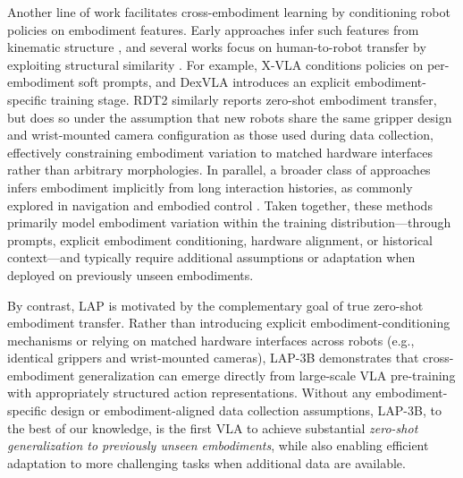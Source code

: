 Another line of work facilitates cross-embodiment learning by conditioning robot policies on embodiment features. Early approaches infer such features from kinematic structure \cite{huang2020policycontrolallshared, kurin2021bodycagerolemorphology, gupta2022metamorphlearninguniversalcontrollers, patel2024getzerographembodimenttransformer, bohlinger2025policyrunallendtoend}, and several works focus on human-to-robot transfer by exploiting structural similarity \cite{chen2024roviaugrobotviewpointaugmentation, lum2025crossinghumanrobotembodimentgap, lepert2025phantomtrainingrobotsrobots, ren2025motiontracksunifiedrepresentation}. For example, X-VLA \cite{zheng2025xvlasoftpromptedtransformerscalable} conditions policies on per-embodiment soft prompts, and DexVLA \cite{wen2025dexvlavisionlanguagemodelplugin} introduces an explicit embodiment-specific training stage. RDT2 \cite{liu2026rdt2exploringscalinglimit} similarly reports zero-shot embodiment transfer, but does so under the assumption that new robots share the same gripper design and wrist-mounted camera configuration as those used during data collection, effectively constraining embodiment variation to matched hardware interfaces rather than arbitrary morphologies. In parallel, a broader class of approaches infers embodiment implicitly from long interaction histories, as commonly explored in navigation and embodied control \cite{hirose2025omnivlaomnimodalvisionlanguageactionmodel, shah2023vintfoundationmodelvisual, yang2024pushinglimitscrossembodimentlearning, shah2023gnmgeneralnavigationmodel}. Taken together, these methods primarily model embodiment variation within the training distribution—through prompts, explicit embodiment conditioning, hardware alignment, or historical context—and typically require additional assumptions or adaptation when deployed on previously unseen embodiments.

By contrast, LAP is motivated by the complementary goal of true zero-shot embodiment transfer. Rather than introducing explicit embodiment-conditioning mechanisms or relying on matched hardware interfaces across robots (e.g., identical grippers and wrist-mounted cameras), LAP-3B demonstrates that cross-embodiment generalization can emerge directly from large-scale VLA pre-training with appropriately structured action representations. Without any embodiment-specific design or embodiment-aligned data collection assumptions, LAP-3B, to the best of our knowledge, is the first VLA to achieve substantial \emph{zero-shot generalization to previously unseen embodiments}, while also enabling efficient adaptation to more challenging tasks when additional data are available.




